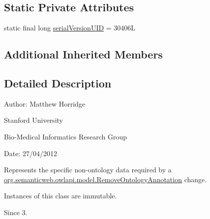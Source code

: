 \subsection*{Static Private Attributes}
\begin{DoxyCompactItemize}
\item 
static final long \hyperlink{classorg_1_1semanticweb_1_1owlapi_1_1change_1_1_remove_ontology_annotation_data_adfe1d0800545ae89b43bfc85ce609841}{serial\-Version\-U\-I\-D} = 30406\-L
\end{DoxyCompactItemize}
\subsection*{Additional Inherited Members}


\subsection{Detailed Description}
Author\-: Matthew Horridge\par
 Stanford University\par
 Bio-\/\-Medical Informatics Research Group\par
 Date\-: 27/04/2012 

Represents the specific non-\/ontology data required by a \hyperlink{classorg_1_1semanticweb_1_1owlapi_1_1model_1_1_remove_ontology_annotation}{org.\-semanticweb.\-owlapi.\-model.\-Remove\-Ontology\-Annotation} change. 

Instances of this class are immutable. 

\begin{DoxySince}{Since}
3. 
\end{DoxySince}


